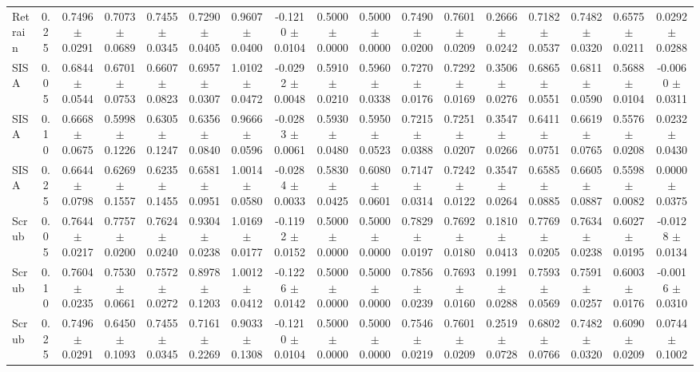\begin{table}[t]
\begin{tabular}{lcccccccccccccccc}
Retrain & 0.25 & 0.7496 $\pm$ 0.0291 & 0.7073 $\pm$ 0.0689 & 0.7455 $\pm$ 0.0345 & 0.7290 $\pm$ 0.0405 & 0.9607 $\pm$ 0.0400 & -0.1210 $\pm$ 0.0104 & 0.5000 $\pm$ 0.0000 & 0.5000 $\pm$ 0.0000 & 0.7490 $\pm$ 0.0200 & 0.7601 $\pm$ 0.0209 & 0.2666 $\pm$ 0.0242 & 0.7182 $\pm$ 0.0537 & 0.7482 $\pm$ 0.0320 & 0.6575 $\pm$ 0.0211 & 0.0292 $\pm$ 0.0288 \\
SISA & 0.05 & 0.6844 $\pm$ 0.0544 & 0.6701 $\pm$ 0.0753 & 0.6607 $\pm$ 0.0823 & 0.6957 $\pm$ 0.0307 & 1.0102 $\pm$ 0.0472 & -0.0292 $\pm$ 0.0048 & 0.5910 $\pm$ 0.0210 & 0.5960 $\pm$ 0.0338 & 0.7270 $\pm$ 0.0176 & 0.7292 $\pm$ 0.0169 & 0.3506 $\pm$ 0.0276 & 0.6865 $\pm$ 0.0551 & 0.6811 $\pm$ 0.0590 & 0.5688 $\pm$ 0.0104 & -0.0060 $\pm$ 0.0311 \\
SISA & 0.10 & 0.6668 $\pm$ 0.0675 & 0.5998 $\pm$ 0.1226 & 0.6305 $\pm$ 0.1247 & 0.6356 $\pm$ 0.0840 & 0.9666 $\pm$ 0.0596 & -0.0283 $\pm$ 0.0061 & 0.5930 $\pm$ 0.0480 & 0.5950 $\pm$ 0.0523 & 0.7215 $\pm$ 0.0388 & 0.7251 $\pm$ 0.0207 & 0.3547 $\pm$ 0.0266 & 0.6411 $\pm$ 0.0751 & 0.6619 $\pm$ 0.0765 & 0.5576 $\pm$ 0.0208 & 0.0232 $\pm$ 0.0430 \\
SISA & 0.25 & 0.6644 $\pm$ 0.0798 & 0.6269 $\pm$ 0.1557 & 0.6235 $\pm$ 0.1455 & 0.6581 $\pm$ 0.0951 & 1.0014 $\pm$ 0.0580 & -0.0284 $\pm$ 0.0033 & 0.5830 $\pm$ 0.0425 & 0.6080 $\pm$ 0.0601 & 0.7147 $\pm$ 0.0314 & 0.7242 $\pm$ 0.0122 & 0.3547 $\pm$ 0.0264 & 0.6585 $\pm$ 0.0885 & 0.6605 $\pm$ 0.0887 & 0.5598 $\pm$ 0.0082 & 0.0000 $\pm$ 0.0375 \\
Scrub & 0.05 & 0.7644 $\pm$ 0.0217 & 0.7757 $\pm$ 0.0200 & 0.7624 $\pm$ 0.0240 & 0.9304 $\pm$ 0.0238 & 1.0169 $\pm$ 0.0177 & -0.1192 $\pm$ 0.0152 & 0.5000 $\pm$ 0.0000 & 0.5000 $\pm$ 0.0000 & 0.7829 $\pm$ 0.0197 & 0.7692 $\pm$ 0.0180 & 0.1810 $\pm$ 0.0413 & 0.7769 $\pm$ 0.0205 & 0.7634 $\pm$ 0.0238 & 0.6027 $\pm$ 0.0195 & -0.0128 $\pm$ 0.0134 \\
Scrub & 0.10 & 0.7604 $\pm$ 0.0235 & 0.7530 $\pm$ 0.0661 & 0.7572 $\pm$ 0.0272 & 0.8978 $\pm$ 0.1203 & 1.0012 $\pm$ 0.0412 & -0.1226 $\pm$ 0.0142 & 0.5000 $\pm$ 0.0000 & 0.5000 $\pm$ 0.0000 & 0.7856 $\pm$ 0.0239 & 0.7693 $\pm$ 0.0160 & 0.1991 $\pm$ 0.0288 & 0.7593 $\pm$ 0.0569 & 0.7591 $\pm$ 0.0257 & 0.6003 $\pm$ 0.0176 & -0.0016 $\pm$ 0.0310 \\
Scrub & 0.25 & 0.7496 $\pm$ 0.0291 & 0.6450 $\pm$ 0.1093 & 0.7455 $\pm$ 0.0345 & 0.7161 $\pm$ 0.2269 & 0.9033 $\pm$ 0.1308 & -0.1210 $\pm$ 0.0104 & 0.5000 $\pm$ 0.0000 & 0.5000 $\pm$ 0.0000 & 0.7546 $\pm$ 0.0219 & 0.7601 $\pm$ 0.0209 & 0.2519 $\pm$ 0.0728 & 0.6802 $\pm$ 0.0766 & 0.7482 $\pm$ 0.0320 & 0.6090 $\pm$ 0.0209 & 0.0744 $\pm$ 0.1002 \\

\end{tabular}
\end{table}
